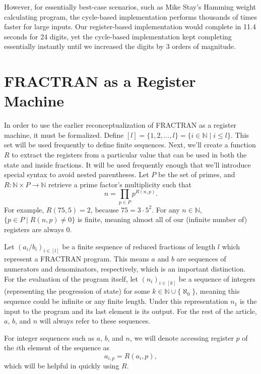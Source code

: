 \documentclass[12pt]{article}
\begin{document}
However, for essentially best-case scenarios, such as Mike Stay's Hamming weight calculating program, the cycle-based implementation performs thousands of times faster for large inputs. Our register-based implementation would complete in 11.4 seconds for 24 digits, yet the cycle-based implementation kept completing essentially instantly until we increased the digits by 3 orders of magnitude.

\section{FRACTRAN as a Register Machine}

In order to use the earlier reconceptualization of FRACTRAN as a register machine, it must be formalized. Define $[l] = \{1, 2, \ldots, l\} = \{i \in \mathbb{N} \mid i \leq l\}$. This set will be used frequently to define finite sequences. Next, we'll create a function $R$ to extract the registers from a particular value that can be used in both the state and inside fractions. It will be used frequently enough that we'll introduce special syntax to avoid nested parentheses. Let $P$ be the set of primes, and $R : \mathbb{N} \times P \to \mathbb{N}$ retrieve a prime factor's multiplicity such that
\[
n = \prod_{p \in P} p^{R(n,p)}.
\]
For example, $R(75, 5) = 2$, because $75 = 3 \cdot 5^2$. For any $n \in \mathbb{N}$, $\{p \in P \mid R(n, p) \neq 0\}$ is finite, meaning almost all of our (infinite number of) registers are always 0.

Let $(a_i/b_i)_{i \in [l]}$ be a finite sequence of reduced fractions of length $l$ which represent a FRACTRAN program. This means $a$ and $b$ are sequences of numerators and denominators, respectively, which is an important distinction. For the evaluation of the program itself, let $(n_i)_{i \in [k]}$ be a sequence of integers (representing the progression of state) for some $k \in \mathbb{N} \cup \{\aleph_0\}$, meaning this sequence could be infinite or any finite length. Under this representation $n_1$ is the input to the program and its last element is its output. For the rest of the article, $a$, $b$, and $n$ will always refer to these sequences.

For integer sequences such as $a$, $b$, and $n$, we will denote accessing register $p$ of the $i$th element of the sequence as
\[
a_{i,p} = R(a_i, p),
\]
which will be helpful in quickly using $R$.
\end{document}

